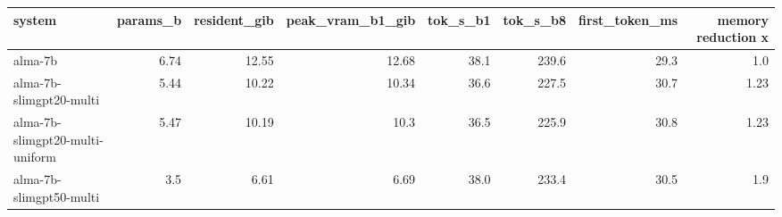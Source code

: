 \begin{tabular}{lrrrrrrr}
\toprule
system & params_b & resident_gib & peak_vram_b1_gib & tok_s_b1 & tok_s_b8 & first_token_ms & memory reduction x \\
\midrule
alma-7b & 6.74 & 12.55 & 12.68 & 38.1 & 239.6 & 29.3 & 1.0 \\
alma-7b-slimgpt20-multi & 5.44 & 10.22 & 10.34 & 36.6 & 227.5 & 30.7 & 1.23 \\
alma-7b-slimgpt20-multi-uniform & 5.47 & 10.19 & 10.3 & 36.5 & 225.9 & 30.8 & 1.23 \\
alma-7b-slimgpt50-multi & 3.5 & 6.61 & 6.69 & 38.0 & 233.4 & 30.5 & 1.9 \\
\bottomrule
\end{tabular}

